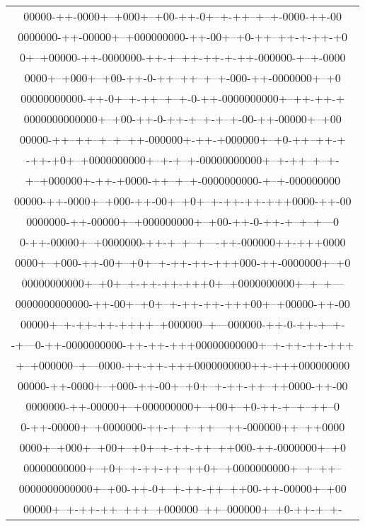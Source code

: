 \begin{table}%
{\footnotesize\tt
\begin{center}\begin{tabular}{c}
00000-++-0000+--+000+--+00-++-0+--+-++--+--+-0000-++-00\\
0000000-++-00000+--+000000000-++-00+--+0-++--++-+-++-+0\\
0+--+00000-++-0000000-++-+--++-++-+-++-000000-+--+-0000\\
0000+--+000+--+00-++-0-++--++--+--+-000-++-0000000+--+0\\
00000000000-++-0+--+-++--+--+-0-++-0000000000+--++-++-+\\
0000000000000+--+00-++-0-++-+--+-+--+-00-++-00000+--+00\\
00000-++--++--+--+--++-000000+-++-+000000+--+0-++--++-+\\
-++-+0+--+0000000000+--+-+--+-00000000000+--+-++--+--+-\\
+--+000000+-++-+0000-++--+--+-0000000000-+--+-000000000\\[2mm]
00000-++-0000+--+000-++-00+--+0+--+-++-++-+++0000-++-00\\
0000000-++-00000+--+000000000+--+00-++-0-++-+--+--+---0\\
0-++-00000+--+0000000-++-+--+--+----++-000000++-+++0000\\
0000+--+000-++-00+--+0+--+-++-++-+++000-++-0000000+--+0\\
00000000000+--+0+--+-++-++-+++0+--+0000000000+--+--+---\\
0000000000000-++-00+--+0+--+-++-++-+++00+--+00000-++-00\\
00000+--+-++-++-++++--+000000--+---000000-++-0-++-+--+-\\
-+---0-++-0000000000-++-++-+++00000000000+--+-++-++-+++\\
+--+000000--+---0000-++-++-+++0000000000++-+++000000000\\[2mm]
00000-++-0000+--+000-++-00+--+0+--+-++-++--++0000-++-00\\
0000000-++-00000+--+000000000+--+00+--+0-++-+--+--++--0\\
0-++-00000+--+0000000-++-+--+--++---++-000000++--++0000\\
0000+--+000+--+00+--+0+--+-++-++--++000-++-0000000+--+0\\
00000000000+--+0+--+-++-++--++0+--+0000000000+--+--++--\\
0000000000000+--+00-++-0+--+-++-++--++00-++-00000+--+00\\
00000+--+-++-++--+++--+000000--++--000000+--+0-++-+--+-\\

\end{tabular}
\end{center}}
\end{table}
